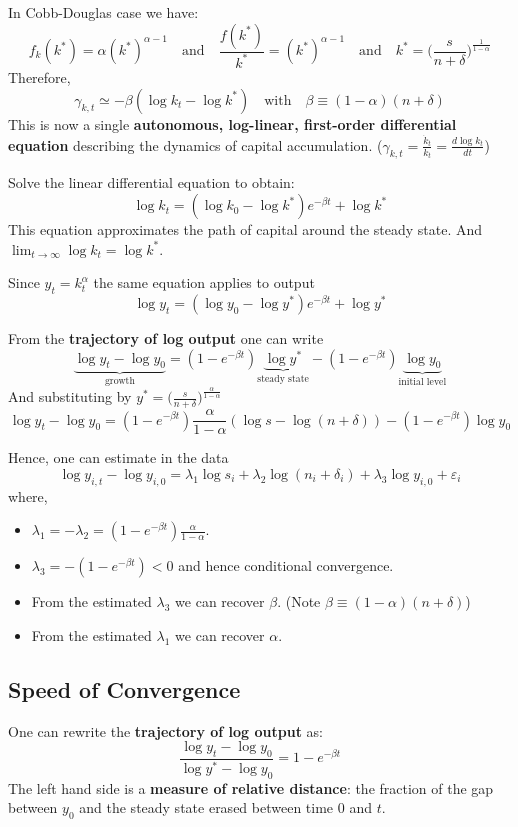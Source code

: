 In Cobb-Douglas case we have: \[
    f_k(k^*) = \alpha(k^*)^{\alpha-1} \quad\text{and}\quad \frac{f(k^*)}{k^*} = (k^*)^{\alpha-1} \quad\text{and}\quad k^* = \Big(\frac{s}{n+\delta}\Big)^{\frac{1}{1-\alpha}}
\]
Therefore, \[
    \gamma_{k,t} \simeq -\beta(\log k_t - \log k^*) \quad\text{with}\quad \beta \equiv (1-\alpha)(n+\delta)
\]
This is now a single \textbf{autonomous, log-linear, first-order differential equation} describing the dynamics of capital accumulation. ($\gamma_{k,t} = \frac{\dot{k}_t}{k_t} = \frac{d \log k_t}{dt}$)

Solve the linear differential equation to obtain: \[
    \log k_t = (\log k_0 - \log k^*)e^{-\beta t} + \log k^*
\]
This equation approximates the path of capital around the steady state. And $\lim_{t \to \infty} \log k_t = \log k^*$.

Since $y_t = k_t^{\alpha}$ the same equation applies to output \[
    \log y_t = (\log y_0 - \log y^*)e^{-\beta t}+\log y^*
\]

From the \textbf{trajectory of log output} one can write \[
    \underbrace{\log y_t - \log y_0}_{\text{growth}} = (1-e^{-\beta t}) \underbrace{\log y^*}_{\text{steady state}} - (1-e^{-\beta t})\underbrace{\log y_0}_{\text{initial level}}
\]
And substituting by $y^* = \Big(\frac{s}{n+\delta}\Big)^{\frac{\alpha}{1-\alpha}}$ \[
    \log y_t - \log y_0 = (1-e^{-\beta t})\frac{\alpha}{1-\alpha}(\log s - \log(n+\delta)) - (1-e^{-\beta t})\log y_0
\]

Hence, one can estimate in the data \[
    \log y_{i,t} - \log y_{i,0} = \lambda_1 \log s_i + \lambda_2 \log(n_i+\delta_i)+\lambda_3 \log y_{i,0} + \varepsilon_i
\]
where, \begin{itemize}
    \item $\lambda_1 = -\lambda_2 = (1-e^{-\beta t})\frac{\alpha}{1-\alpha}$.
    \item $\lambda_3 =  - (1-e^{-\beta t}) < 0$ and hence conditional convergence.
    \item From the estimated $\lambda_3$ we can recover $\beta$. (Note $\beta\equiv(1-\alpha)(n+\delta)$)
    \item From the estimated $\lambda_1$ we can recover $\alpha$.
\end{itemize}

\subsection{Speed of Convergence}
One can rewrite the \textbf{trajectory of log output} as: \[
    \frac{\log y_t - \log y_0}{\log y^*-\log y_0} = 1-e^{-\beta t}
\] The left hand side is a \textbf{measure of relative distance}: the fraction of the gap between $y_0$ and the steady state erased between time $0$ and $t$.

